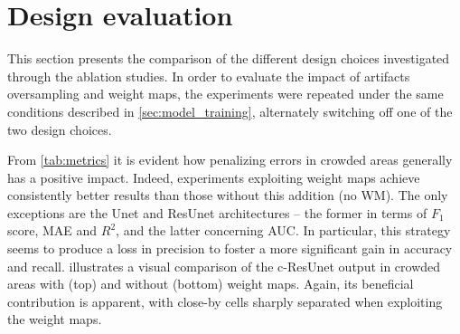 \section{Design evaluation}

This section presents the comparison of the different design choices investigated through the ablation studies.
In order to evaluate the impact of artifacts oversampling and weight maps, the experiments were repeated under the same conditions described in \cref{sec:model_training}, alternately switching off one of the two design choices.

From \cref{tab:metrics} it is evident how penalizing errors in crowded areas generally has a positive impact. Indeed, experiments exploiting weight maps achieve consistently better results than those without this addition (no WM). The only exceptions are the Unet and ResUnet architectures -- the former in terms of $F_1$ score, MAE and $R^2$, and the latter concerning AUC.  
In particular, this strategy seems to produce a loss in precision to foster a more significant gain in accuracy and recall.
 illustrates a visual comparison of the c-ResUnet output in crowded areas with (top) and without (bottom) weight maps. 
Again, its beneficial contribution is apparent, with close-by cells sharply separated when exploiting the weight maps.

